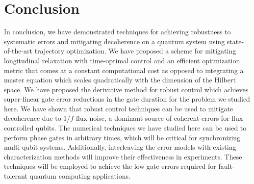 \section{Conclusion}
In conclusion, we have demonstrated techniques for achieving robustness to systematic
errors and mitigating decoherence on a quantum system using state-of-the-art trajectory
optimization. We have proposed a scheme for mitigating longitudinal relaxation with time-optimal
control and an efficient optimization metric that comes at a constant computational cost as
opposed to integrating a master equation which scales quadratically with
the dimension of the Hilbert space.
We have proposed the derivative method for robust control which achieves
super-linear gate error reductions in the gate duration for the problem we studied here.
We have shown that robust control techniques can be used to mitigate decoherence due
to 1/$f$ flux noise, a dominant source of coherent errors for flux controlled qubits.
The numerical techniques we have studied here can be used to perform phase gates in arbitrary times,
which will be critical for synchronizing multi-qubit systems. Additionally,
interleaving the error models with existing
characterization methods will improve their effectiveness in experiments.
These techniques will be employed to achieve the low gate errors
required for fault-tolerant quantum computing applications. 
